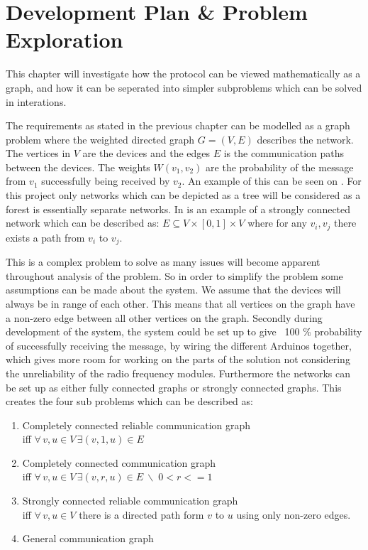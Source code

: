 \chapter{Development Plan \& Problem Exploration}\label{chp:Problems}
This chapter will investigate how the protocol can be viewed mathematically as a graph, and how it can be seperated into simpler subproblems which can be solved in interations.

\noindent The requirements as stated in the previous chapter can be modelled as a graph problem where the weighted directed graph $G = (V, E)$ describes the network. 
The vertices in $V$ are the devices and the edges $E$ is the communication paths between the devices. 
The weights $W(v_1, v_2)$ are the probability of the message from $v_1$ successfully being received by $v_2$.
An example of this can be seen on .
For this project only networks which can be depicted as a tree will be considered as a forest is essentially separate networks.
In  is an example of a strongly connected network which can be described as: $E \subseteq V \times [0,1] \times V$ where for any $v_i, v_j$ there exists a path from $v_i$ to $v_j$.


\noindent This is a complex problem to solve as many issues will become apparent throughout analysis of the problem.
So in order to simplify the problem some assumptions can be made about the system.
We assume that the devices will always be in range of each other.
This means that all vertices on the graph have a non-zero edge between all other vertices on the graph.
Secondly during development of the system, the system could be set up to give ~100 \% probability of successfully receiving the message, by wiring the different Arduinos together, which gives more room for working on the parts of the solution not considering the unreliability of the radio frequency modules.
Furthermore the networks can be set up as either fully connected graphs or strongly connected graphs.
This creates the four sub problems which can be described as:  %

\begin{enumerate}[label=\itshape \arabic*\upshape)]
    \item Completely connected reliable communication graph \\   
    iff $\forall\, v, u \in V \, \exists (v,1,u)\in E$
    \item Completely connected communication graph \\
    iff $\forall\, v, u \in V \, \exists (v,r,u)\in E\ \backslash \; 0 < r <= 1$
    \item Strongly connected reliable communication graph \\  
    iff $\forall\, v, u \in V $ there is a directed path form $v$ to $u$ using only non-zero edges.    
    \item General communication graph
\end{enumerate}

